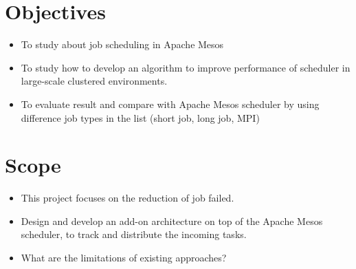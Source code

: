 \documentclass[12pt,oneside,openright,a4paper]{cpe-english-project}
\begin{document}
\section{Objectives}
\begin{itemize}
  \item  To study about job scheduling in Apache Mesos
  \item  To study how to develop an algorithm to improve performance of scheduler in large-scale clustered environments.
  \item  To evaluate result and compare with Apache Mesos scheduler by using difference job types in the list (short job, long job, MPI)
\end{itemize}

\section{Scope}
\begin{itemize}
  \item  This project focuses on the reduction of job failed. 
  \item  Design and develop an add-on architecture on top of the Apache Mesos scheduler, to track and distribute the incoming tasks.
  \item  What are the limitations of existing approaches? 
\end{itemize}

\newpage

\end{document}
